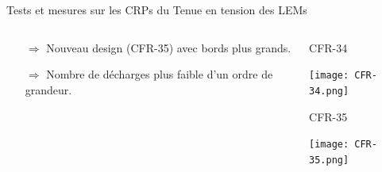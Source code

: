 \begin{frame}{Tests et mesures sur les CRPs du \SSS{}}{Tenue en tension des LEMs}
\begin{columns}
\begin{column}{0.5\textwidth}
\begin{scriptsize}
\begin{itemize}
	    				\item[$\Rightarrow$] Nouveau design (CFR-35) avec bords plus grands.
	    				\item[$\Rightarrow$] Nombre de décharges plus faible d'un ordre de grandeur.
	    			\end{itemize}
	    		\end{scriptsize}
    		\end{column}\hfill
    		\begin{column}{0.5\textwidth}
    			\begin{minipage}{0.48\textwidth}
    				\centering
    				\begin{scriptsize}
	    				CFR-34
	    			\end{scriptsize}
    				\texttt{[image: CFR-34.png]}
    			\end{minipage}\hfill
    			\begin{minipage}{0.48\textwidth}
    				\centering
    				\begin{scriptsize}
	    				CFR-35
    				\end{scriptsize}
    				\texttt{[image: CFR-35.png]}
    			\end{minipage}
    		\end{column}
    	\end{columns}
    \end{frame}

